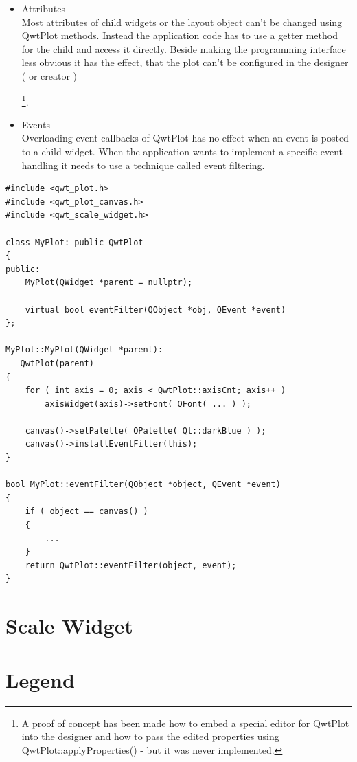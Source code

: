 \documentclass[12pt,a4paper]{book}
\begin{document}
\begin{itemize}

\item Attributes\\
Most attributes of child widgets or the layout object can't be 
changed using QwtPlot methods. Instead the application code has to 
use a getter method for the child and access it directly. 
Beside making the programming interface less obvious it has the effect, 
that the plot can't be configured in the designer ( or creator )

\footnote{A proof of concept has been made how to embed a special 
editor for QwtPlot into the designer and how to pass the edited 
properties using QwtPlot::applyProperties() - but it was never implemented.}.

\item Events\\
Overloading event callbacks of QwtPlot has no effect when an event is posted to a child widget. When the application wants to implement a specific event handling it needs to use a technique called event filtering.

\end{itemize}

\begin{lstlisting}
#include <qwt_plot.h>
#include <qwt_plot_canvas.h>
#include <qwt_scale_widget.h>

class MyPlot: public QwtPlot
{
public:
    MyPlot(QWidget *parent = nullptr);
    
    virtual bool eventFilter(QObject *obj, QEvent *event)
};

MyPlot::MyPlot(QWidget *parent):
   QwtPlot(parent)
{
    for ( int axis = 0; axis < QwtPlot::axisCnt; axis++ )
    	axisWidget(axis)->setFont( QFont( ... ) );

	canvas()->setPalette( QPalette( Qt::darkBlue ) );
    canvas()->installEventFilter(this);
} 

bool MyPlot::eventFilter(QObject *object, QEvent *event)
{
    if ( object == canvas() )
    {
        ...
    }
    return QwtPlot::eventFilter(object, event);
}
\end{lstlisting}


\section{Scale Widget}
\section{Legend}
\end{document}
